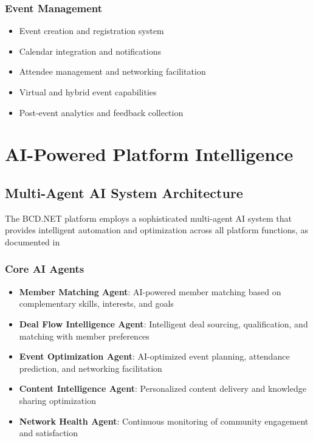 \subsubsection{Event Management}
\begin{itemize}
    \item Event creation and registration system
    \item Calendar integration and notifications
    \item Attendee management and networking facilitation
    \item Virtual and hybrid event capabilities
    \item Post-event analytics and feedback collection
\end{itemize}

\section{AI-Powered Platform Intelligence}

\subsection{Multi-Agent AI System Architecture}

The BCD.NET platform employs a sophisticated multi-agent AI system that provides intelligent automation and optimization across all platform functions, as documented in \:

\subsubsection{Core AI Agents}

\begin{itemize}
    \item \textbf{Member Matching Agent}: AI-powered member matching based on complementary skills, interests, and goals
    \item \textbf{Deal Flow Intelligence Agent}: Intelligent deal sourcing, qualification, and matching with member preferences
    \item \textbf{Event Optimization Agent}: AI-optimized event planning, attendance prediction, and networking facilitation
    \item \textbf{Content Intelligence Agent}: Personalized content delivery and knowledge sharing optimization
    \item \textbf{Network Health Agent}: Continuous monitoring of community engagement and satisfaction
\end{itemize}

